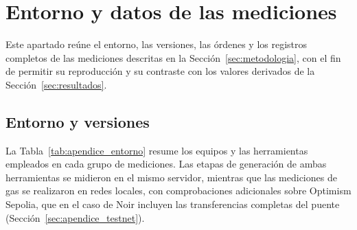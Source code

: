 \section{Entorno y datos de las mediciones}
\label{sec:apendice_mediciones}

Este apartado reúne el entorno, las versiones, las órdenes y los registros completos de las
mediciones descritas en la Sección~\ref{sec:metodologia}, con el fin de permitir su reproducción y
su contraste con los valores derivados de la Sección~\ref{sec:resultados}.

\subsection{Entorno y versiones}
\label{sec:apendice_entorno}

La Tabla~\ref{tab:apendice_entorno} resume los equipos y las herramientas empleados en cada grupo
de mediciones. Las etapas de generación de ambas herramientas se midieron en el mismo servidor,
mientras que las mediciones de gas se realizaron en redes locales, con comprobaciones adicionales
sobre Optimism Sepolia, que en el caso de Noir incluyen las transferencias completas del puente
(Sección~\ref{sec:apendice_testnet}).


